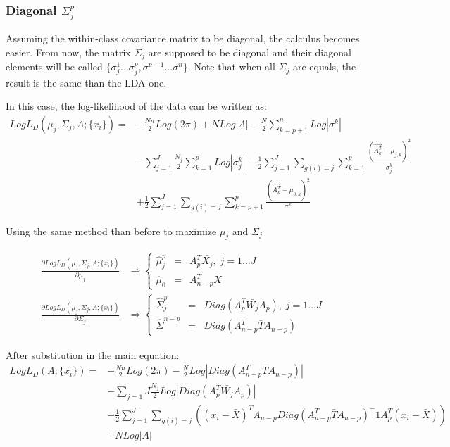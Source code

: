 \subsubsection{Diagonal $\Sigma_j^p$}
Assuming the within-class covariance matrix to be diagonal, the calculus becomes easier.
From now, the matrix $\Sigma_j$ are supposed to be diagonal and their diagonal elements will be called $\{\sigma_j^1...\sigma_j^p,
\sigma^{p + 1}...\sigma^n\}$.
Note that when all $\Sigma_j$ are equals, the result is the same than the LDA one.

In this case, the log-likelihood of the data can be written as:
$$
\begin{array}{cl}
  Log L_D(\mu_j, \Sigma_j, A; \{x_i\}) = & -\frac{N n}{2} Log (2\pi) + N Log|A| - \frac{N}{2}\sum\limits_{k = p + 1}^n Log|\sigma^k| \\
  & - \sum\limits_{j = 1}^J \frac{N_j}{2} \sum\limits_{k = 1}^p Log|\sigma_j^k| - \frac{1}{2}\sum\limits_{j = 1}^J\sum\limits_{g(i) = j}
  \sum\limits_{k = 1}^p \frac{(\vec{A_k^T} - \mu_{j,k})^2}{\sigma_j^k} \\
  & + \frac{1}{2}\sum\limits_{j = 1}^J\sum\limits_{g(i) = j}
  \sum\limits_{k = p + 1}^p \frac{(\vec{A_k^T} - \mu_{0,k})^2}{\sigma^k}
\end{array}
$$

Using the same method than before to maximize $\mu_j$ and $\Sigma_j$

$$
\begin{array}{cc}
  \frac{\partial Log L_D(\mu_j, \Sigma_j, A; \{x_i\})}{\partial \mu_j} & \Rightarrow \left \{
  \begin{array}{ccc}
    \hat\mu_j^p & = & A_p^T\bar{X_j} ,\; j = 1...J\\
    \hat\mu_0 & = & A_{n - p}^T\bar{X}
  \end{array}
  \right . \\
  \frac{\partial Log L_D(\mu_j, \Sigma_j, A; \{x_i\})}{\partial \Sigma_j} & \Rightarrow \left \{
  \begin{array}{ccc}
    \hat\Sigma_j^p & = & Diag(A_p^T\bar{W_j}A_p), \; j = 1...J\\
    \hat\Sigma^{n - p} & = & Diag(A_{n - p}^T\bar{T}A_{n - p})
  \end{array}
  \right .
\end{array}
$$

After substitution in the main equation:
$$
\begin{array}{cl}
  Log L_D(A; \{x_i\}) = & - \frac{N n}{2} Log(2\pi) - \frac{N}{2} Log|Diag(A_{n - p}^T\bar{T}A_{n - p})| \\
  & - \sum\limits_{j = 1}{J}\frac{N_j}{2} Log|Diag(A_p^T\bar{W_j}A_p)| \\
  & - \frac{1}{2} \sum\limits_{j = 1}^J \sum\limits_{g(i) = j} ((x_i - \bar{X} )^T A_{n - p} Diag( A_{n - p}^T \bar{T} A_{n - p} )^-1 A_p^T(x_i - \bar{X}))\\
  & + N Log |A|
\end{array}
$$

